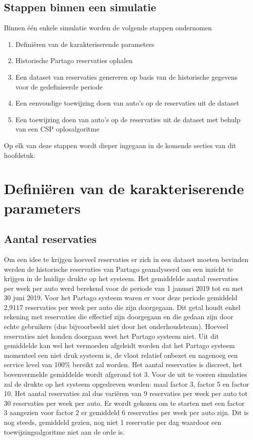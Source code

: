 \subsection{Stappen binnen een simulatie}
Binnen één enkele simulatie worden de volgende stappen ondernomen
\begin{enumerate}
	\item Definiëren van de karakteriserende parameters
	\item Historische Partago reservaties ophalen
	\item Een dataset van reservaties genereren op basis van de historische gegevens voor de gedefinieerde periode
	\item Een eenvoudige toewijzing doen van auto's op de reservaties uit de dataset
	\item Een toewijzing doen van auto's op de reservaties uit de dataset met behulp van een CSP oplosalgoritme 
	
\end{enumerate}
Op elk van deze stappen wordt dieper ingegaan in de komende secties van dit hoofdstuk. 

\section{Definiëren van de karakteriserende parameters}
\subsection{Aantal reservaties}
Om een idee te krijgen hoeveel reservaties er zich in een dataset moeten bevinden werden de historische reservaties van Partago geanalyseerd om een inzicht te krijgen in de huidige drukte op het systeem. Het gemiddelde aantal reservaties per week per auto werd berekend voor de periode van 1 januari 2019 tot en met 30 juni 2019. Voor het Partago systeem waren er voor deze periode gemiddeld 2,9117 reservaties per week per auto die zijn doorgegaan. Dit getal houdt enkel rekening met reservaties die effectief zijn doorgegaan en die gedaan zijn door echte gebruikers (dus bijvoorbeeld niet door het onderhoudsteam). Hoeveel reservaties niet konden doorgaan weet het Partago systeem niet. Uit dit gemiddelde kan wel het vermoeden afgeleidt worden dat het Partago systeem momenteel een niet druk systeem is, de vloot relatief onbezet en nagenoeg een service level van 100\% bereikt zal worden. Het aantal reservaties is discreet, het bovenvermelde gemiddelde wordt afgerond tot 3. Voor de uit te voeren simulaties zal de drukte op het systeem opgedreven worden: maal factor 3, factor 5 en factor 10. Het aantal reservaties zal dus variëren van 9 reservaties per week per auto tot 30 reservaties per week per auto. Er wordt gekozen om te starten met een factor 3 aangezien voor factor 2 er gemiddeld 6 reservaties per week per auto zijn. Dit is nog steeds, gemiddeld gezien, nog niet 1 reservatie per dag waardoor een toewijzingsalgoritme niet aan de orde is.

